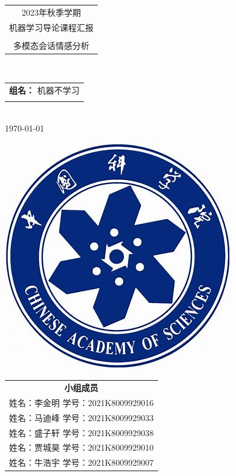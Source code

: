 \documentclass[11pt]{article}
\begin{document}
\setlength{\headheight}{14pt}
\pagestyle{fancy}
\chead{}

\begin{titlepage}
    \centering
    \Huge\bfseries 
    \begin{tabular}{c}
        2023年秋季学期\\
        机器学习导论课程汇报\\
        \\
        \huge 多模态会话情感分析\\
    \end{tabular}\\
    \mdseries
    \LARGE
    \begin{tabular}{c}
        {\bf 组名：}
        {机器不学习}\\
        \\
    \end{tabular}
    \\
    \Large
    \today
\end{titlepage}

\newpage

\begin{titlepage}
    \centering
    \includegraphics[scale = 0.4]{graph/th.jpg}\\
    \Large
    \begin{tabular}{c}
        {\LARGE\bf 小组成员}\\
        {姓名：李金明}
        {学号：2021K8009929016}\\
        {姓名：马迪峰}
        {学号：2021K8009929033}\\
        {姓名：盛子轩}
        {学号：2021K8009929038}\\
        {姓名：贾城昊}
        {学号：2021K8009929010}\\
        {姓名：牛浩宇}
        {学号：2021K8009929007}\\
    \end{tabular}\\
\end{titlepage}
\end{document}

